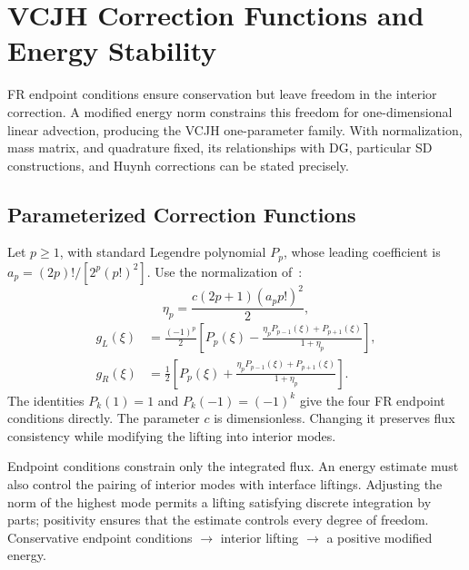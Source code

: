 \chapter{VCJH Correction Functions and Energy Stability}\label{ch:12}
\begin{chaptersummary}
FR endpoint conditions ensure conservation but leave freedom in the interior correction. A modified energy norm constrains this freedom for one-dimensional linear advection, producing the VCJH one-parameter family. With normalization, mass matrix, and quadrature fixed, its relationships with DG, particular SD constructions, and Huynh corrections can be stated precisely.
\end{chaptersummary}

\section{Parameterized Correction Functions}
Let $p\ge1$, with standard Legendre polynomial $P_p$,
whose leading coefficient is $a_p=(2p)!/[2^p(p!)^2]$.
Use the normalization of~\cite{vincent2011}:
\[
\eta_p=\frac{c(2p+1)(a_pp!)^2}{2},
\]
\begin{equation}\label{eq:vcjh-functions}
\begin{aligned}
g_L(\xi)&=\frac{(-1)^p}{2}
\left[P_p(\xi)-\frac{\eta_pP_{p-1}(\xi)+P_{p+1}(\xi)}{1+\eta_p}\right],\\
g_R(\xi)&=\frac12
\left[P_p(\xi)+\frac{\eta_pP_{p-1}(\xi)+P_{p+1}(\xi)}{1+\eta_p}\right].
\end{aligned}
\end{equation}
The identities $P_k(1)=1$ and $P_k(-1)=(-1)^k$ give the four FR endpoint conditions directly.
The parameter $c$ is dimensionless. Changing it preserves flux consistency while modifying the lifting into interior modes.

{Endpoint conditions constrain only the integrated flux. An energy estimate must also control the pairing of interior modes with interface liftings. Adjusting the norm of the highest mode permits a lifting satisfying discrete integration by parts; positivity ensures that the estimate controls every degree of freedom.}
{Conservative endpoint conditions $\longrightarrow$ interior lifting $\longrightarrow$ a positive modified energy.}

